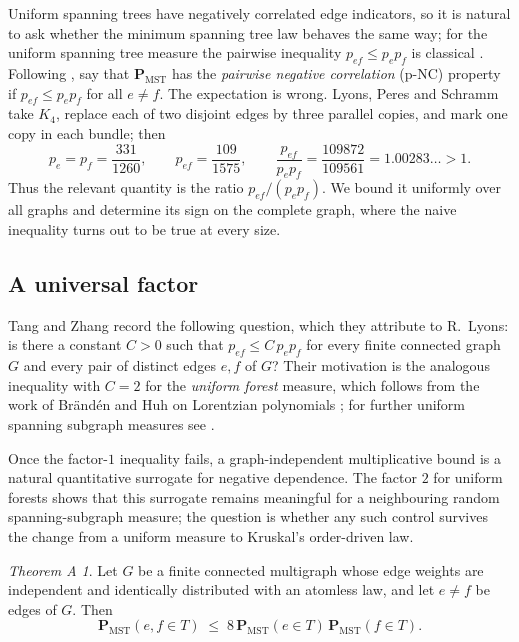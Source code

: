 \documentclass[11pt,a4paper]{amsart}
\theoremstyle{plain}
\theoremstyle{definition}
\theoremstyle{remark}
\newtheorem*{theoremA}{Theorem A}
\newcommand{\PMST}{\mathbf{P}_{\mathrm{MST}}}
\begin{document}
Uniform spanning trees have negatively correlated edge indicators, so it is
natural to ask whether the minimum spanning tree law behaves the same way; for
the uniform spanning tree measure the pairwise inequality $p_{ef}\le p_ep_f$ is
classical \cite[Chapter 4]{LP}. Following \cite{TZ}, say that $\PMST$ has the
\emph{pairwise negative correlation} (p-NC) property if $p_{ef}\le p_ep_f$ for
all $e\ne f$. The expectation is wrong. Lyons, Peres and Schramm \cite[\S5]{LPS}
take $K_4$, replace each of two disjoint edges by three parallel copies, and mark
one copy in each bundle; then
\begin{equation}
\label{eq:lps}
p_e=p_f=\frac{331}{1260},\qquad p_{ef}=\frac{109}{1575},\qquad
\frac{p_{ef}}{p_ep_f}=\frac{109872}{109561}=1.00283\ldots>1 .
\end{equation}
Thus the relevant quantity is the ratio $p_{ef}/(p_ep_f)$. We bound it uniformly
over all graphs and determine its sign on the complete graph, where the naive
inequality turns out to be true at every size.

\subsection{A universal factor}
\label{ssec:introA}

Tang and Zhang \cite[Question 3.13]{TZ} record the following question, which they
attribute to R.~Lyons: is there a constant $C>0$ such that
$p_{ef}\le C\,p_ep_f$ for every finite connected graph $G$ and every pair of
distinct edges $e,f$ of $G$? Their motivation is the analogous inequality with
$C=2$ for the \emph{uniform forest} measure, which follows from the work of
Br\"and\'en and Huh on Lorentzian polynomials \cite{BH}; for further uniform
spanning subgraph measures see \cite{TZ2}.

Once the factor-$1$ inequality fails, a graph-independent multiplicative bound
is a natural quantitative surrogate for negative dependence. The factor $2$ for
uniform forests shows that this surrogate remains meaningful for a neighbouring
random spanning-subgraph measure; the question is whether any such control
survives the change from a uniform measure to Kruskal's order-driven law.

\begin{theoremA}
Let $G$ be a finite connected multigraph whose edge weights are independent and
identically distributed with an atomless law, and let $e\ne f$ be edges of $G$.
Then
\[
\PMST(e,f\in T)\;\le\;8\,\PMST(e\in T)\,\PMST(f\in T).
\]
\end{theoremA}
\end{document}
